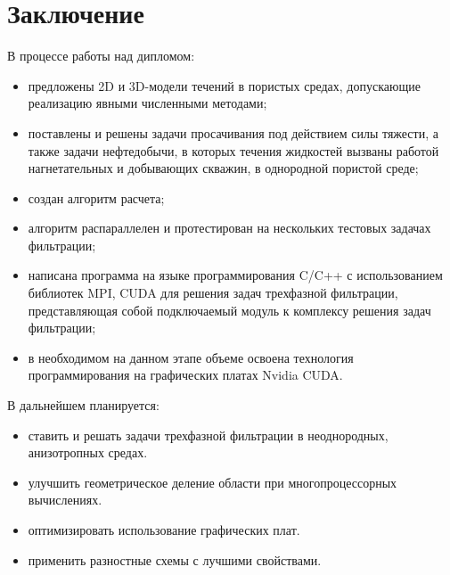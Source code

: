 \section{Заключение}

В процессе работы над дипломом:

\begin{itemize}
	\item 	предложены 2D и 3D-модели течений в пористых средах,
	допускающие реализацию явными численными методами;

	\item поставлены и решены задачи просачивания  под действием силы тяжести, а 
	также задачи нефтедобычи, в которых течения жидкостей вызваны
	работой нагнетательных и добывающих скважин, в однородной 
	пористой среде;

	\item 	создан алгоритм расчета;
	
	\item 	алгоритм распараллелен и протестирован на нескольких тестовых задачах 
	фильтрации;
	
	\item	написана программа на языке программирования C/C++ с использованием 
	библиотек MPI, CUDA для решения задач трехфазной фильтрации, 
	представляющая собой подключаемый модуль к комплексу решения задач 
	фильтрации;
	
	\item в необходимом на данном этапе объеме освоена технология 
	программирования на графических платах Nvidia CUDA.

\end{itemize}

В дальнейшем планируется:

\begin{itemize}
	\item	ставить и решать задачи трехфазной фильтрации в
		неоднородных, анизотропных средах.
		
	\item 	улучшить геометрическое деление области при многопроцессорных
	вычислениях.

	\item 	оптимизировать использование графических плат.

	\item 	применить разностные схемы с лучшими свойствами.

\end{itemize}
